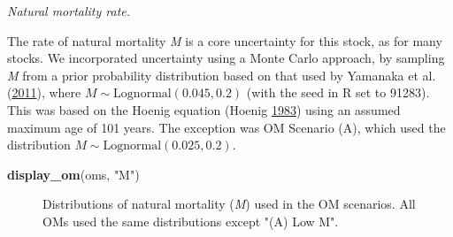 \documentclass[11pt]{book}
\newenvironment{Shaded}{}{}
\newcommand{\KeywordTok}[1]{\textcolor[rgb]{0.00,0.44,0.13}{\textbf{{#1}}}}
\newcommand{\DecValTok}[1]{\textcolor[rgb]{0.25,0.63,0.44}{{#1}}}
\newcommand{\FloatTok}[1]{\textcolor[rgb]{0.25,0.63,0.44}{{#1}}}
\newcommand{\StringTok}[1]{\textcolor[rgb]{0.25,0.44,0.63}{{#1}}}
\newcommand{\CommentTok}[1]{\textcolor[rgb]{0.38,0.63,0.69}{\textit{{#1}}}}
\newcommand{\NormalTok}[1]{{#1}}
\newcommand{\OperatorTok}[1]{\textcolor[rgb]{0.00,0.44,0.13}{\textbf{{#1}}}}
\begin{document}
\emph{Natural mortality rate.}

The rate of natural mortality \emph{M} is a core uncertainty for this stock, as for many stocks. We incorporated uncertainty using a Monte Carlo approach, by sampling \emph{M} from a prior probability distribution based on that used by Yamanaka et al. (\protect\hyperlink{ref-yamanaka2011}{2011}), where \(M \sim \textrm{Lognormal}(0.045, 0.2)\) (with the seed in R set to 91283). This was based on the Hoenig equation (Hoenig \protect\hyperlink{ref-hoenig1983}{1983}) using an assumed maximum age of 101 years. The exception was OM Scenario (A), which used the distribution \(M \sim \textrm{Lognormal}(0.025, 0.2)\).
\begin{Shaded}
\end{Shaded}
\begin{Shaded}
\begin{Highlighting}[]
\KeywordTok{display_om}\NormalTok{(oms, }\StringTok{"M"}\NormalTok{)}
\end{Highlighting}
\end{Shaded}
\begin{figure}[htb]

{\centering {} 

}

\caption{Distributions of natural mortality (\emph{M}) used in the OM scenarios. All OMs used the same distributions except "(A) Low M".}\label{fig:desc-stock-m-yelloweye}
\end{figure}
\label{app:desc-stock-h-yelloweye}
\end{document}

